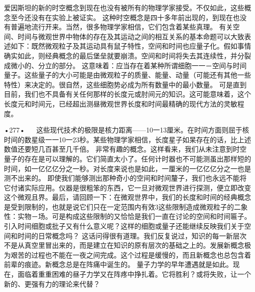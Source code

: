爱因斯坦的新的时空概念到现在也没有被所有的物理学家接受。不仅如此，这些概念至今还没有在实验上被证实。
这种时空概念是四十多年前出现的，到现在也没有普遍地流行开来。当然，很多物理学家相信，它们包含着某些真理。
有关空间、时间与微观世界中物体的存在及其运动之间的相互关系的基本命题可以大致表述如下：既然微观粒子及其运动具有鼠子特性，空间和时间也应量子化。假如事情确实如此，则经典概念的最后堡垒就要崩溃。空间和时间将失去其连续性，并分裂成微小的、分立的部分。
这意味着：应当存在着某种所谓细胞一一－空间与时间量子。这些量子的大小可能是由微观粒子的质量、能量、动量（可能还有其他一些特性）来决定的。很自然，这些细胞势必成为所有数量中的最小数量。
可是直到目前，我们也不具备有关任何那样的长度元或肘间元的知识。这可能意味着，这个长度元和时间元，已经超出测昼微观世界长度和时间最精确的现代方法的灵敏程度。

•277•
  
这些现代技术的极限是核力距离——10一13厘米。在时间方面则屈于核时间的数星级一一10一23秒。某些物理学家相信，长度星子如杲存在的话，比上述数值还要短几百甚至几千倍。
非常有趣的概念。这样看来，我们从未注意到时空量子的存在是可以理解的。它们简直太小了。任何计时器也不可能测虽出那样短的时间，如一亿亿亿分之一秒。对长度来说也是如此，一厘米的一亿亿亿分之一也是测不出来的。
即使我们能够测出那种奇小的空间和时间釐子，我们也永远不能将它付诸实际应用。仪器是很粗笨的东西，它一旦对微观世界进行探测，便立即改变这个微观且界。最后，请回顾一下：在微观世界中，我们的长度和时间的经典概念是受到限制的，也就是说它们只在一定范围内有效3这些限制造成微观粒子的二象性：实物－场。可是构成这些限制的又恰恰是我们一直在讨论的空间和时间匾子。
引入时间细胞或批子又有什么意义呢？这样的细胞或量子还能继续反映我们关于空间和时间的日常概念吗？
这话问得很有道理。我们反复说过，知识的每一新层次不是从真空里冒出来的，而是建立在知识的原有层次的基础之上的。发展新概念极为艰苦的过程也不能在一夜之间完成。这个过程是缓慢的，而且新概念也总包含着前辈的痕迹。新概念总是在阵痛中诞生的。
量子力学的早年遭遇就是如此。现在，面临着重重困难的昼子力学又在阵疼中挣扎着。它将胜利？或将失败，让一个新的、更强有力的理论来代替？

